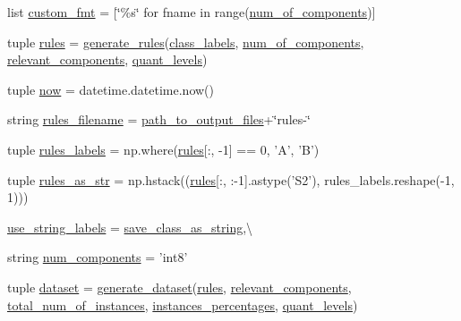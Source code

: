 \begin{DoxyCompactItemize}
\item 
list \hyperlink{namespacedata__generation_a4f985887946a96aa23f5ee6af6ec33fd}{custom\+\_\+fmt} = \mbox{[}\char`\"{}\%s\char`\"{} for fname in range(\hyperlink{namespacedata__generation_ad68308d6e9bf4bd2485a44ce0c52315c}{num\+\_\+of\+\_\+components})\mbox{]}
\item 
tuple \hyperlink{namespacedata__generation_a18484efee600914bdb61f4082236d2ba}{rules} = \hyperlink{namespacedata__generation_a723f3547cdfa6066526de7b8964a0a49}{generate\+\_\+rules}(\hyperlink{namespacedata__generation_ab52d553b1eb5f4c6d065e0435753addc}{class\+\_\+labels}, \hyperlink{namespacedata__generation_ad68308d6e9bf4bd2485a44ce0c52315c}{num\+\_\+of\+\_\+components}, \hyperlink{namespacedata__generation_afa9b1b91a7860372739bca028f41263b}{relevant\+\_\+components}, \hyperlink{namespacedata__generation_adf1cda3bf67a0646998d7ad03f8d1337}{quant\+\_\+levels})
\item 
tuple \hyperlink{namespacedata__generation_a4f08e445af07b6a8af849d8fd67dfbc9}{now} = datetime.\+datetime.\+now()
\item 
string \hyperlink{namespacedata__generation_a2fd941c060f70244057a35a916a6a9d7}{rules\+\_\+filename} = \hyperlink{namespacedata__generation_ad7ee72f39a9a602967e77e4da382566a}{path\+\_\+to\+\_\+output\+\_\+files}+\char`\"{}rules-\/\char`\"{}
\item 
tuple \hyperlink{namespacedata__generation_aa245bd201fe9810d8a8d8d615c4915ee}{rules\+\_\+labels} = np.\+where(\hyperlink{namespacedata__generation_a18484efee600914bdb61f4082236d2ba}{rules}\mbox{[}\+:, -\/1\mbox{]} == 0, 'A', 'B')
\item 
tuple \hyperlink{namespacedata__generation_a1e7ee3bfd1df183fdb922bbc4e93d12e}{rules\+\_\+as\+\_\+str} = np.\+hstack((\hyperlink{namespacedata__generation_a18484efee600914bdb61f4082236d2ba}{rules}\mbox{[}\+:, \+:-\/1\mbox{]}.astype('S2'), rules\+\_\+labels.\+reshape(-\/1, 1)))
\item 
\hyperlink{namespacedata__generation_a65cdb95b35877149855b39ef209ada8e}{use\+\_\+string\+\_\+labels} = \hyperlink{namespacedata__generation_ae8c6a78af0481f316865220c829b86d2}{save\+\_\+class\+\_\+as\+\_\+string},\textbackslash{}
\item 
string \hyperlink{namespacedata__generation_a577eb8996c6d5ddad4042ac0552f5aaa}{num\+\_\+components} = 'int8'
\item 
tuple \hyperlink{namespacedata__generation_ad3ed025b5adf596264de6710e2b25996}{dataset} = \hyperlink{namespacedata__generation_a0a700e2749ed935a31ac58217132cb76}{generate\+\_\+dataset}(\hyperlink{namespacedata__generation_a18484efee600914bdb61f4082236d2ba}{rules}, \hyperlink{namespacedata__generation_afa9b1b91a7860372739bca028f41263b}{relevant\+\_\+components}, \hyperlink{namespacedata__generation_a963ce4f506a2b3bb6acb94915445f716}{total\+\_\+num\+\_\+of\+\_\+instances}, \hyperlink{namespacedata__generation_a1c4e107080b11e6ef67edd30bfb93b05}{instances\+\_\+percentages}, \hyperlink{namespacedata__generation_adf1cda3bf67a0646998d7ad03f8d1337}{quant\+\_\+levels})

\end{DoxyCompactItemize}
